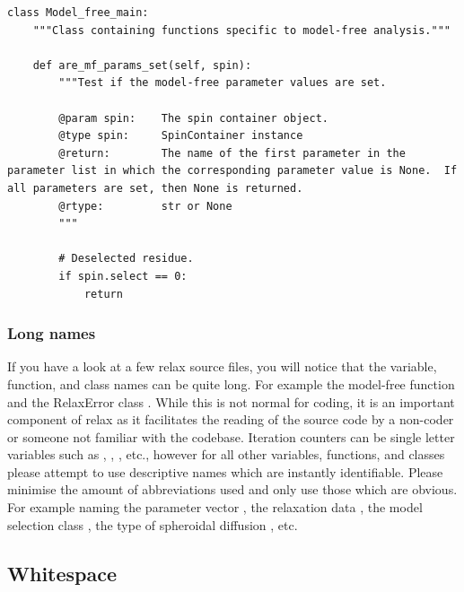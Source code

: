 \begin{lstlisting}
class Model_free_main:
    """Class containing functions specific to model-free analysis."""

    def are_mf_params_set(self, spin):
        """Test if the model-free parameter values are set.

        @param spin:    The spin container object.
        @type spin:     SpinContainer instance
        @return:        The name of the first parameter in the parameter list in which the corresponding parameter value is None.  If all parameters are set, then None is returned.
        @rtype:         str or None
        """

        # Deselected residue.
        if spin.select == 0:
            return
\end{lstlisting}



\subsubsection{Long names}

If you have a look at a few relax source files, you will notice that the variable, function, and class names can be quite long.
For example the model-free function  and the RelaxError class .
While this is not normal for coding, it is an important component of relax as it facilitates the reading of the source code by a non-coder or someone not familiar with the codebase.
Iteration counters can be single letter variables such as , , , etc., however for all other variables, functions, and classes please attempt to use descriptive names which are instantly identifiable.
Please minimise the amount of abbreviations used and only use those which are obvious.
For example naming the parameter vector , the relaxation data , the model selection class , the type of spheroidal diffusion , etc.



\subsection{Whitespace}


